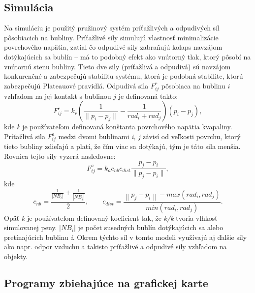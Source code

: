 \subsection{Simulácia}

Na simuláciu je použitý pružinový systém príťažlivých a odpudivých síl pôsobiacich na bubliny. Príťažlivé sily simulujú vlastnosť minimalizácie povrchového napätia, zatiaľ čo odpudivé sily zabraňujú kolaps navzájom dotýkajúcich sa bublín – má to podobný efekt ako vnútorný tlak, ktorý pôsobí na vnútornú stenu bubliny. Tieto dve sily (príťažlivá a odpudivá) sú navzájom konkurenčné a zabezpečujú stabilitu systému, ktorá je podobná stabilite, ktorú zabezpečujú Plateauové pravidlá. Odpudivá sila $F_{ij}^{r}$ pôsobiaca na bublinu $i$ vzhľadom na jej kontakt s bublinou $j$ je definovaná takto:
\begin{equation}
	F_{ij}^{r}=k_{r}\left(\frac{1}{\parallel p_{i} - p_{j} \parallel} - \frac{1}{rad_{i} + rad_{j}}\right) \left(p_i - p_j\right), 
\end{equation}
kde \textit{k} je používateľom definovaná konštanta povrchového napätia kvapaliny. Príťažlivá sila \textit{$F_{ij}^{a}$} medzi dvomi bublinami \textit{i, j} závisí od veľkosti povrchu, ktorý tieto bubliny zdieľajú a platí, že čím viac sa dotýkajú, tým je táto sila menšia. Rovnica tejto sily vyzerá nasledovne:
\begin{equation}
	F_{ij}^{a} = k_{a}c_{nb}c_{dist}\frac{p_{j} - p_{i}}{\parallel p_{j} - p_{i}\parallel},
\end{equation}
kde
\begin{equation}
	c_{nb} = \frac{\frac{1}{\left | NB_{i} \right |} + \frac{1}{\left | NB_{j} \right |}}{2},\qquad c_{dist} = \frac{\left \| p_{j} - p_{i} \right \| - max(rad_{i}, rad_{j})}{min(rad_{i}, rad_{j})}.
\end{equation}
Opäť \textit{k} je používateľom definovaný koeficient tak, že \textit{k/k} tvoria vlhkosť simulovanej peny. $\left | NB_{i} \right |$ je počet susedných bublín dotýkajúcich sa alebo pretínajúcich bublinu \textit{i}. Okrem týchto síl v tomto modeli využívajú aj ďalšie sily ako napr. odpor vzduchu a takisto príťažlivé a odpudivé sily vzhľadom na objekty.

\subsection{Programy zbiehajúce na grafickej karte}

